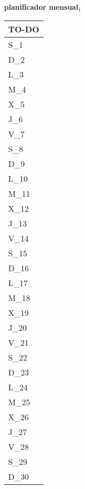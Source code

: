 \clearpage
{\raggedright
	\fontsize{25}{50}\selectfont
	\textbf{\NextYear}
}\scriptsize{\textbf{planificador mensual$_1$}}\\[11.3pt]



	\noindent\dotfill
	\renewcommand{\arraystretch}{1.5}\scriptsize
		\begin{longtabu} to \textwidth { X[l]}
		\centering \small{\textbf{TO-DO}} \\
		\toprule
		S_{1} \dotfill\\
		D_{2} \dotfill\\
		\hline
		L_{3} \dotfill\\
		M_{4} \dotfill\\
		X_{5} \dotfill\\
		J_{6} \dotfill\\
		V_{7} \dotfill\\
		S_{8} \dotfill\\
		D_{9} \dotfill\\
		\hline
		L_{10} \dotfill\\
		M_{11} \dotfill\\
		X_{12} \dotfill\\
		J_{13} \dotfill\\
		V_{14} \dotfill\\
		S_{15} \dotfill\\
		D_{16} \dotfill\\
		\hline
		L_{17} \dotfill\\
		M_{18} \dotfill\\
		X_{19} \dotfill\\
		J_{20} \dotfill\\
		V_{21} \dotfill\\
		S_{22} \dotfill\\
		D_{23} \dotfill\\
		\hline
		L_{24} \dotfill\\
		M_{25} \dotfill\\
		X_{26} \dotfill\\
		J_{27} \dotfill\\
		V_{28} \dotfill\\
		S_{29} \dotfill\\
		D_{30} \dotfill\\
		\hline

		\bottomrule

	\end{longtabu}


\clearpage
